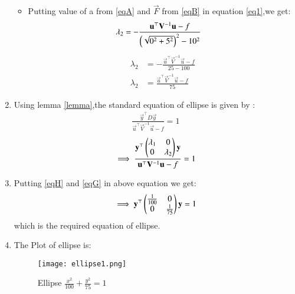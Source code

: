 \documentclass[journal,12pt,twocolumn]{IEEEtran}
\begin{document}
\begin{enumerate}
\begin{itemize}
\item Putting value of a from \eqref{eqA} and $\vec{F}$ from \eqref{eqB} in equation \eqref{eq1},we get:
\begin{align}
   \lambda_2&= -\frac{\mathbf{u}^{\top}\mathbf{V}^{-1}\mathbf{u}-f}{\left(\sqrt{0^2+5^2}\right)^2-10^2}
    \end{align}
    \begin{align}
     \lambda_2&= -\frac{\vec{u}^{\top}\vec{V}^{-1}\vec{u}-f}{25-100}
     \\
      \lambda_2&= \frac{\vec{u}^{\top}\vec{V}^{-1}\vec{u}-f}{75}\label{eqG}
\end{align}
\end{itemize}
\item Using lemma \eqref{lemma},the standard equation of ellipse is given by :
\begin{align}
\frac{\vec{y}^{\top}D\vec{y}}{\vec{u}^{\top}\vec{V}^{-1}\vec{u}-f}=1
\end{align}
\begin{align}
\implies \frac{\mathbf{y}^{\top}\begin{pmatrix}\lambda_1& 0 \\ 0 & \lambda_2\end{pmatrix}\mathbf{y} }{\mathbf{u}^{\top}\mathbf{V}^{-1}\mathbf{u}-f}=1
\end{align}
\item Putting \eqref{eqH} and \eqref{eqG} in above equation we get:
\begin{align}
\implies \mathbf{y}^{\top}\begin{pmatrix}\frac{1}{100}& 0 \\ 0 & \frac{1}{75}\end{pmatrix}\mathbf{y}=1
\end{align}
which is the required equation of ellipse.
\item The Plot of ellipse is:
\begin{figure}[!ht]
    \centering
    \texttt{[image: ellipse1.png]}
    \caption{Ellipse $\frac{x^2}{100} + \frac{y^2}{75} = 1$}
    \label{fig:ellipse}
\end{figure} 
\end{enumerate}
\end{document}
